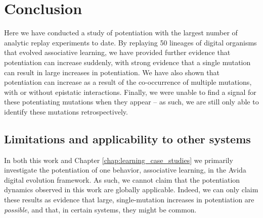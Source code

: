 \section{Conclusion}

Here we have conducted a study of potentiation with the largest number of analytic replay experiments to date.
By replaying 50 lineages of digital organisms that evolved associative learning, we have provided further evidence that potentiation can increase suddenly, with strong evidence that a single mutation can result in large increases in potentiation. 
We have also shown that potentiation can increase as a result of the co-occurrence of multiple mutations, with or without epistatic interactions. 
Finally, we were unable to find a signal for these potentiating mutations when they appear -- as such, we are still only able to identify these mutations retrospectively. 

\subsection{Limitations and applicability to other systems}




%

In both this work and Chapter \ref{chap:learning_case_studies} we primarily investigate the potentiation of one behavior, associative learning, in the Avida digital evolution framework. 
As such, we cannot claim that the potentiation dynamics observed in this work are globally applicable. 
Indeed, we can only claim these results as evidence that large, single-mutation increases in potentiation are \textit{possible}, and that, in certain systems, they might be common. 

